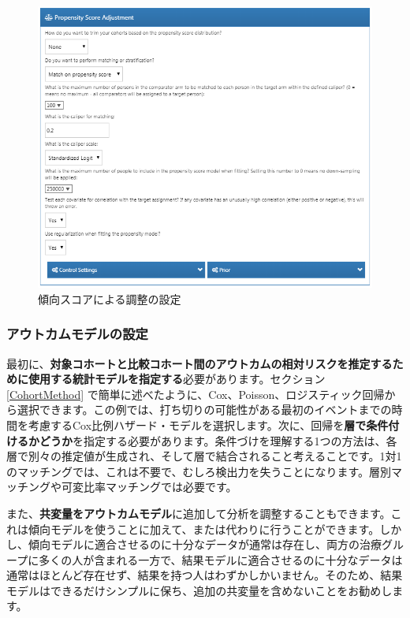 \documentclass[
  11pt]{book}
\theoremstyle{definition}
\theoremstyle{definition}
\theoremstyle{definition}
\theoremstyle{definition}
\theoremstyle{remark}
\begin{document}
\begin{figure}

{\centering \includegraphics[width=1\linewidth]{images/PopulationLevelEstimation/psSettings} 

}

\caption{傾向スコアによる調整の設定}\label{fig:psSettings}
\end{figure}

\subsubsection*{アウトカムモデルの設定}\label{ux30a2ux30a6ux30c8ux30abux30e0ux30e2ux30c7ux30ebux306eux8a2dux5b9a}

最初に、\textbf{対象コホートと比較コホート間のアウトカムの相対リスクを推定するために使用する統計モデルを指定する}必要があります。セクション \ref{CohortMethod} で簡単に述べたように、Cox、Poisson、ロジスティック回帰から選択できます。この例では、打ち切りの可能性がある最初のイベントまでの時間を考慮するCox比例ハザード・モデルを選択します。次に、回帰を\textbf{層で条件付けるかどうか}を指定する必要があります。条件づけを理解する1つの方法は、各層で別々の推定値が生成され、そして層で結合されること考えることです。1対1のマッチングでは、これは不要で、むしろ検出力を失うことになります。層別マッチングや可変比率マッチングでは必要です。 

また、\textbf{共変量をアウトカムモデル}に追加して分析を調整することもできます。これは傾向モデルを使うことに加えて、または代わりに行うことができます。しかし、傾向モデルに適合させるのに十分なデータが通常は存在し、両方の治療グループに多くの人が含まれる一方で、結果モデルに適合させるのに十分なデータは通常はほとんど存在せず、結果を持つ人はわずかしかいません。そのため、結果モデルはできるだけシンプルに保ち、追加の共変量を含めないことをお勧めします。
\end{document}
